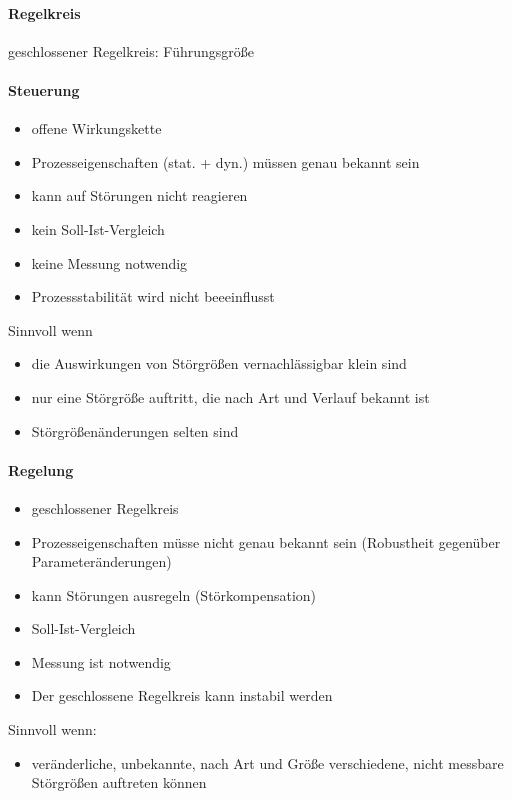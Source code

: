 \documentclass[a4paper]{scrartcl}
\begin{document}
\paragraph{Regelkreis} geschlossener Regelkreis:
Führungsgröße

\paragraph{Steuerung}
\begin{itemize}
    \item offene Wirkungskette
    \item Prozesseigenschaften (stat. + dyn.) müssen genau bekannt sein
    \item kann auf Störungen nicht reagieren
    \item kein Soll-Ist-Vergleich
    \item keine Messung notwendig
    \item Prozessstabilität wird nicht beeeinflusst
\end{itemize}

Sinnvoll wenn

\begin{itemize}
    \item die Auswirkungen von Störgrößen vernachlässigbar klein sind
    \item nur eine Störgröße auftritt, die nach Art und Verlauf bekannt ist
    \item Störgrößenänderungen selten sind
\end{itemize}

\paragraph{Regelung}
\begin{itemize}
    \item geschlossener Regelkreis
    \item Prozesseigenschaften müsse nicht genau bekannt sein (Robustheit gegenüber Parameteränderungen)
    \item kann Störungen ausregeln (Störkompensation)
    \item Soll-Ist-Vergleich
    \item Messung ist notwendig
    \item Der geschlossene Regelkreis kann instabil werden
\end{itemize}

Sinnvoll wenn:

\begin{itemize}
    \item veränderliche, unbekannte, nach Art und Größe verschiedene, nicht messbare Störgrößen auftreten können
\end{itemize}
\end{document}
